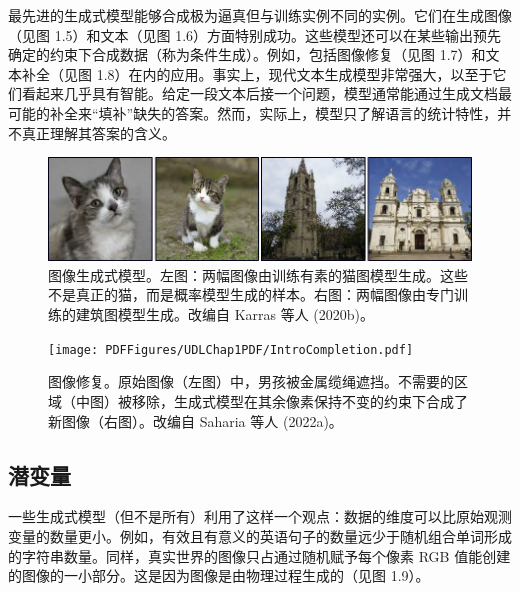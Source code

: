 \documentclass[lang=cn,newtx,10pt,scheme=chinese]{elegantbook}
\begin{document}
最先进的生成式模型能够合成极为逼真但与训练实例不同的实例。它们在生成图像（见图 1.5）和文本（见图 1.6）方面特别成功。这些模型还可以在某些输出预先确定的约束下合成数据（称为条件生成）。例如，包括图像修复（见图 1.7）和文本补全（见图 1.8）在内的应用。事实上，现代文本生成模型非常强大，以至于它们看起来几乎具有智能。给定一段文本后接一个问题，模型通常能通过生成文档最可能的补全来“填补”缺失的答案。然而，实际上，模型只了解语言的统计特性，并不真正理解其答案的含义。

\begin{figure}
	\centering
	\includegraphics[width=0.7\linewidth]{PDFFigures/UDLChap1PDF/IntroSynthesis_C.pdf}
	\caption{图像生成式模型。左图：两幅图像由训练有素的猫图模型生成。这些不是真正的猫，而是概率模型生成的样本。右图：两幅图像由专门训练的建筑图模型生成。改编自 Karras 等人 (2020b)。}

\end{figure}




\begin{figure}
	\centering
	\texttt{[image: PDFFigures/UDLChap1PDF/IntroCompletion.pdf]}
	\caption{图像修复。原始图像（左图）中，男孩被金属缆绳遮挡。不需要的区域（中图）被移除，生成式模型在其余像素保持不变的约束下合成了新图像（右图）。改编自 Saharia 等人 (2022a)。}
\end{figure}



\subsection{潜变量}
一些生成式模型（但不是所有）利用了这样一个观点：数据的维度可以比原始观测变量的数量更小。例如，有效且有意义的英语句子的数量远少于随机组合单词形成的字符串数量。同样，真实世界的图像只占通过随机赋予每个像素 RGB 值能创建的图像的一小部分。这是因为图像是由物理过程生成的（见图 1.9）。
\end{document}
